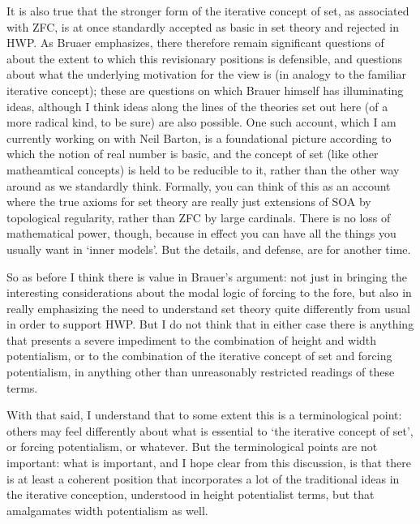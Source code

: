 \documentclass{article}
\begin{document}
It is also true that the stronger form of the iterative concept of 
set, as associated with ZFC, is at once standardly accepted as basic in 
set theory
and rejected in HWP. As Bruaer emphasizes, there therefore remain significant questions 
of about the extent to which this revisionary positions is defensible, 
and questions about what the underlying motivation for the view is (in 
analogy to the familiar iterative concept); these are questions 
on which Brauer himself has illuminating ideas, although I think ideas 
along the lines of the theories set out here (of a more radical 
kind, to be sure) are also possible. One such account, which I am currently 
working on with Neil Barton, is a foundational picture according to which the notion 
of real number is basic, and the concept of set (like other matheamtical concepts)
is held to be reducible to it, rather than the other way around as we standardly 
think. Formally, you can think of this as an account where 
the true axioms for set theory are really just extensions of 
SOA by topological regularity, rather than ZFC by large cardinals. There is 
no loss of mathematical power, though, because in effect you can have 
all the things you usually want in `inner models'.
But the details, and defense, are for another time. 

So as before I think there is value in Brauer's argument: not just in bringing the 
interesting considerations about the modal logic of forcing to the fore,
but also in really emphasizing the need to understand set theory quite differently 
from usual in order to support HWP.
But I do not think that in either case there 
is anything that presents a severe impediment to the combination of height and width 
potentialism, or to the combination of the iterative concept of set and forcing potentialism,
in anything other than unreasonably restricted readings of these terms. 

With that said,
I understand that to some extent this is a terminological point: others may 
feel differently about what is essential to `the iterative concept of set', 
or forcing potentialism, or whatever.
But the terminological points are not important: what is important,
and I hope clear 
from this discussion, is that there is 
at least a coherent 
position that incorporates a lot of the traditional ideas in the 
iterative conception, understood in height potentialist terms, but that amalgamates 
width potentialism as well. 
\end{document}
